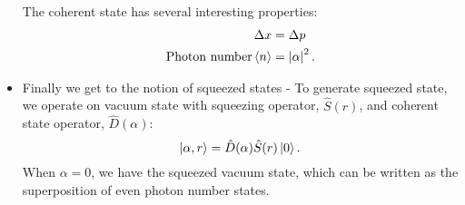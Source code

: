 \begin{itemize}
  \noindent The coherent state has several interesting properties:
  \begin{equation}\label{key}
    \begin{aligned}
      \Delta x &=\Delta p\\
      \text{Photon number} \left\langle n \right\rangle& = \left|\alpha\right|^2.
    \end{aligned}
  \end{equation}
\item Finally we get  to the notion of squeezed states -  To generate  squeezed state, we  operate on
  vacuum  state  with  squeezing  operator,  $ \hat{S}(r)  $,  and  coherent  state  operator,
  $ \hat{D}(\alpha) $:
  \begin{equation}\label{key}
    \ket{\alpha,r} = \hat{D}(\alpha)\hat{S}(r)\ket{0}.
  \end{equation}
  \noindent When $  \alpha = 0 $,  we have the squeezed vacuum  state, which can be  written as the
  superposition of even photon number states. 
\end{itemize}

\newpage

